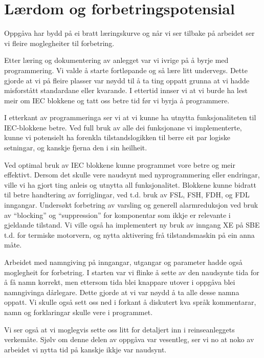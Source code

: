 \section{Lærdom og forbetringspotensial}
\thispagestyle{fancy}

Oppgåva har bydd på ei bratt læringskurve og når vi ser tilbake på arbeidet ser vi fleire moglegheiter til forbetring.

Etter læring og dokumentering av anlegget var vi ivrige på å byrje med programmering.
Vi valde å starte fortløpande og så lære litt undervegs.
Dette gjorde at vi på fleire plasser var nøydd til å ta ting oppatt grunna at vi hadde misforstått standardane eller kvarande.
I ettertid innser vi at vi burde ha lest meir om \gls{IEC} blokkene og tatt oss betre tid før vi byrja å programmere.

I etterkant av programmeringa ser vi at vi kunne ha utnytta funksjonaliteten til IEC-blokkene betre. 
Ved full bruk av alle dei funksjonane vi implementerte, kunne vi potensielt ha forenkla tilstandslogikken til berre eit par logiske setningar, 
og kanskje fjerna den i sin heilheit.

Ved optimal bruk av IEC blokkene kunne programmet vore betre og meir effektivt. 
Dersom det skulle vere naudsynt med nyprogrammering eller endringar, ville vi ha gjort ting anleis og utnytta all funksjonalitet.
Blokkene kunne bidratt til betre handtering av forriglingar, ved t.d. bruk av FSL, FSH, FDH, og FDL inngangar. \newline
Undersøkt forbetring av varsling og generell alarmreduksjon ved bruk av ``blocking'' og ``suppression'' for komponentar som ikkje er relevante i gjeldande tilstand.
Vi ville også ha implementert ny bruk av inngang XE på \gls{SBE} t.d. for termiske motorvern, og nytta aktivering frå tilstandsmaskin på ein anna måte.

Arbeidet med namngiving på inngangar, utgangar og parameter hadde også moglegheit for forbetring.
I starten var vi flinke å sette av den naudsynte tida for å få namn korrekt, men ettersom tida blei knappare utover i oppgåva
blei namngivinga dårlegare. Dette gjorde at vi var nøydd å ta alle desse namna oppatt. \newline
Vi skulle også sett oss ned i forkant å diskutert kva språk kommentarar, namn og forklaringar skulle vere i programmet.

Vi ser også at vi moglegvis sette oss litt for detaljert inn i reinseanleggets verkemåte.
Sjølv om denne delen av oppgåva var vesentleg, ser vi no at noko av arbeidet vi nytta tid på kanskje ikkje var naudsynt.

